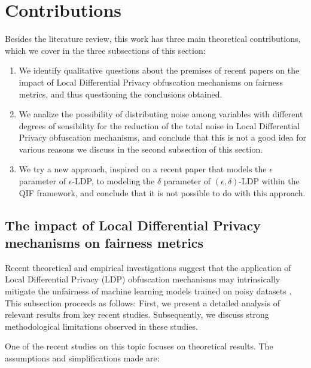 \documentclass[conference]{IEEEtran}
\begin{document}
\section{Contributions}
Besides the literature review, this work has three main theoretical contributions, which we cover in the three subsections of this section:

\begin{enumerate}
	\item We identify qualitative questions about the premises of recent papers on the impact of Local Differential Privacy obfuscation mechanisms on fairness metrics, and thus questioning the conclusions obtained.
	\item We analize the possibility of distributing noise among variables with different degrees of sensibility for the reduction of the total noise in Local Differential Privacy obfuscation mechanisms, and conclude that this is not a good idea for various reasons we discuss in the second subsection of this section.
	\item We try a new approach, inspired on a recent paper \cite{fernandes2022explaining} that models the $\epsilon$ parameter of $\epsilon$-LDP, to modeling the $\delta$ parameter of $(\epsilon, \delta)$-LDP within the QIF framework, and conclude that it is not possible to do with this approach.
\end{enumerate}

\subsection{The impact of Local Differential Privacy mechanisms on fairness metrics}\label{subsec:ldpunfair}

Recent theoretical and empirical investigations suggest that the application of Local Differential Privacy (LDP) obfuscation mechanisms may intrinsically mitigate the unfairness of machine learning models trained on noisy datasets \cite{makhlouf2024systematicformalstudyimpact}\cite{makhlouf2024impact}\cite{arcolezi2023local}. This subsection proceeds as follows: First, we present a detailed analysis of relevant results from key recent studies. Subsequently, we discuss strong methodological limitations observed in these studies.

One of the recent studies on this topic \cite{makhlouf2024systematicformalstudyimpact} focuses on theoretical results. The assumptions and simplifications made are:
\end{document}
